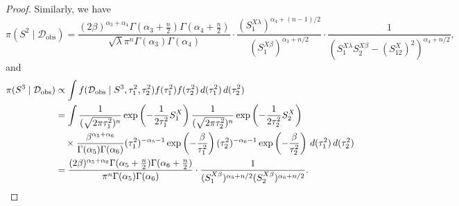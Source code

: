 \documentclass[10pt,a4paper]{amsart}
\newcommand{\obsdata}{\train_{\text{obs}}}
\newcommand{\train}{\mathcal{D}}
\begin{document}
\begin{proof}
    Similarly, we have
    \begin{equation}
        \pi(S^2\mid\obsdata) = \frac{(2\beta)^{\alpha_3+\alpha_4} \Gamma(\alpha_3+\frac{n}{2})\Gamma(\alpha_4+\frac{n}{2})}{\sqrt{\lambda} \pi^n \Gamma(\alpha_3)\Gamma(\alpha_4)} \cdot \frac{ (S_1^{X\lambda})^{\alpha_4+(n-1)/2}}{(S_1^{X\beta})^{\alpha_3+n/2}} \cdot \frac{1}{(S_1^{X\lambda} S_2^{X\beta} - (S_{12}^X)^2)^{\alpha_4+n/2}},
        \label{eq:post_G2}
    \end{equation}
    and
    \begin{align}
        \notag \pi(S^3\mid\obsdata) &\propto \int f(\obsdata\mid S^3, \tau_1^2, \tau_2^2) f(\tau_1^2)f(\tau_2^2)\, d(\tau_1^2)\, d(\tau_2^2) \\
        \notag &= \int \frac{1}{(\sqrt{2\pi \tau_1^2})^n}\exp \left(-\frac{1}{2\tau_1^2}S_1^X \right) \frac{1}{(\sqrt{2\pi \tau_2^2})^n}\exp \left(-\frac{1}{2\tau_2^2}S_2^X \right)\\
        \notag &\quad \times \frac{\beta^{\alpha_5+\alpha_6}}{\Gamma(\alpha_5)\Gamma(\alpha_6)} (\tau_1^2)^{-\alpha_5-1} \exp \left(-\frac{\beta}{\tau_1^2} \right) (\tau_2^2)^{-\alpha_6-1} \exp \left(-\frac{\beta}{\tau_2^2} \right)\, d(\tau_1^2)\, d(\tau_2^2)\\
        &= \frac{(2\beta)^{\alpha_5+\alpha_6} \Gamma(\alpha_5+\frac{n}{2})\Gamma(\alpha_6+\frac{n}{2})}{ \pi^n \Gamma(\alpha_5)\Gamma(\alpha_6)} \cdot \frac{1}{ (S_1^{X\beta})^{\alpha_5+n/2}(S_2^{X\beta})^{\alpha_6+n/2}}.
        \label{eq:post_G3}
    \end{align}
\end{proof}
\end{document}
